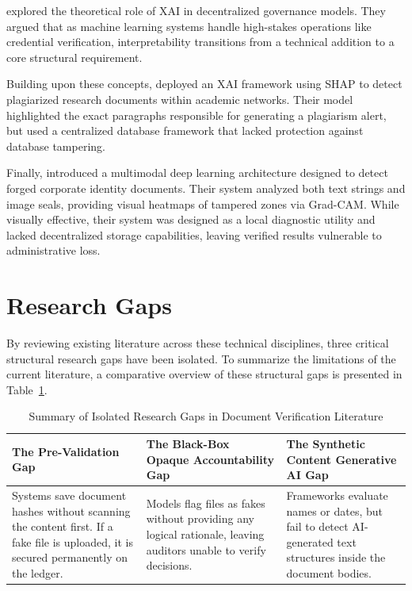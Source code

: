  \cite{chahar2025explainable} explored the theoretical role of XAI in decentralized governance models. They argued that as machine learning systems handle high-stakes operations like credential verification, interpretability transitions from a technical addition to a core structural requirement.

Building upon these concepts, \cite{hassan2025explainable} deployed an XAI framework using SHAP to detect plagiarized research documents within academic networks. Their model highlighted the exact paragraphs responsible for generating a plagiarism alert, but used a centralized database framework that lacked protection against database tampering.

Finally,\cite{nguyen2025multimodal} introduced a multimodal deep learning architecture designed to detect forged corporate identity documents. Their system analyzed both text strings and image seals, providing visual heatmaps of tampered zones via Grad-CAM. While visually effective, their system was designed as a local diagnostic utility and lacked decentralized storage capabilities, leaving verified results vulnerable to administrative loss.

\section{Research Gaps}
By reviewing existing literature across these technical disciplines, three critical structural research gaps have been isolated. To summarize the limitations of the current literature, a comparative overview of these structural gaps is presented in Table~\ref{tab:research_gaps}.

\begin{table}[htbp]
\caption{Summary of Isolated Research Gaps in Document Verification Literature}
\label{tab:research_gaps}
\centering
\small
\begin{tabular}{|p{4cm}|p{4cm}|p{4cm}|}
\hline
\textbf{The Pre-Validation Gap} & \textbf{The Black-Box Opaque Accountability Gap} & \textbf{The Synthetic Content Generative AI Gap} \\ \hline
Systems save document hashes without scanning the content first. If a fake file is uploaded, it is secured permanently on the ledger. & Models flag files as fakes without providing any logical rationale, leaving auditors unable to verify decisions. & Frameworks evaluate names or dates, but fail to detect AI-generated text structures inside the document bodies. \\ \hline
\end{tabular}
\end{table}

